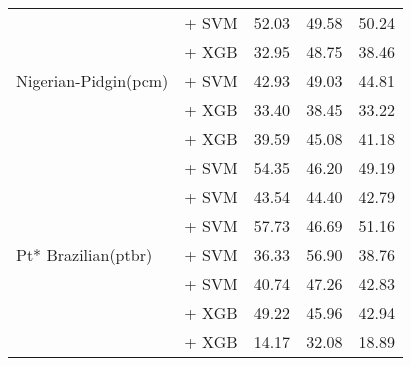 \begin{longtable}{llccc}
    \midrule
    \multirow{5}{*}{Nigerian-Pidgin(pcm)} & \citep{wang2024multilingual} + SVM                                 & 52.03                                & 49.58              & 50.24             \\
                                          & \citep{feng2022languageagnosticbertsentenceembedding} + XGB        & 32.95                                & 48.75              & 38.46             \\
                                          & \citep{feng2022languageagnosticbertsentenceembedding} + SVM        & 42.93                                & 49.03              & 44.81             \\
                                          & \citep{all-MiniLM-L12-v2} + XGB                                    & 33.40                                & 38.45              & 33.22             \\
                                          & \citep{sturua2024jinaembeddingsv3multilingualembeddingstask} + XGB & 39.59                                & 45.08              & 41.18             \\

    \midrule
    \multirow{7}{*}{Pt* Brazilian(ptbr)}  & \citep{wang2024multilingual} + SVM                                 & 54.35                                & 46.20              & 49.19             \\
                                          & \citep{filho2023bertportuguesenliassin2} + SVM                     & 43.54                                & 44.40              & 42.79             \\
                                          & \citep{souza2020bertimbau} + SVM                                   & 57.73                                & 46.69              & 51.16             \\
                                          & \citep{melo2023bertlargeportuguesests} + SVM                       & 36.33                                & 56.90              & 38.76             \\
                                          & \citep{sturua2024jinaembeddingsv3multilingualembeddingstask} + SVM & 40.74                                & 47.26              & 42.83             \\
                                          & \citep{sturua2024jinaembeddingsv3multilingualembeddingstask} + XGB & 49.22                                & 45.96              & 42.94             \\
                                          & \citep{all-MiniLM-L12-v2} + XGB                                    & 14.17                                & 32.08              & 18.89             \\


\end{longtable}
